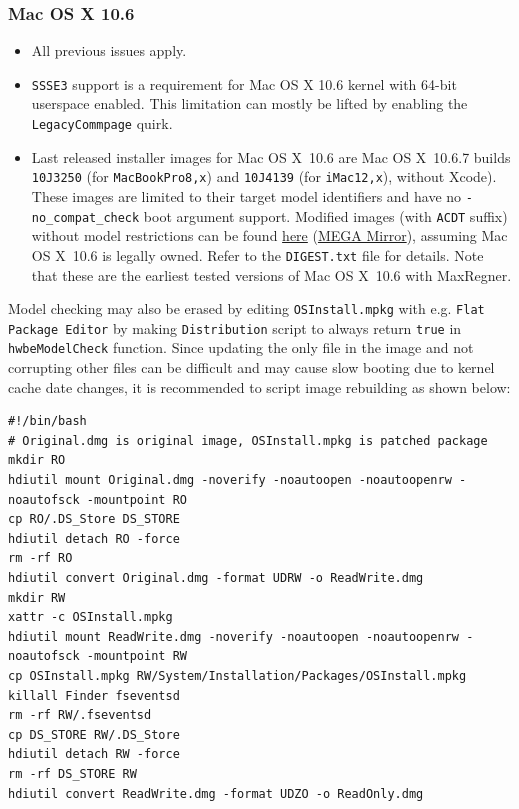 \documentclass[]{article}
\makeatletter
\renewcommand{\label}[1]{%
\zref@wrapper@immediate{\oldlabel{#1}}}  %
\makeatother
\begin{document}
\subsubsection{Mac OS X 10.6}\label{legacy106}

\begin{itemize}
  \item All previous issues apply.
  \item \texttt{SSSE3} support is a requirement for Mac OS X 10.6 kernel
    with 64-bit userspace enabled. This limitation can mostly be lifted
    by enabling the \texttt{LegacyCommpage} quirk.
  \item Last released installer images for Mac OS X~10.6 are Mac OS X~10.6.7
    builds \texttt{10J3250} (for \texttt{MacBookPro8,x}) and
    \texttt{10J4139} (for \texttt{iMac12,x}), without Xcode). These
    images are limited to their target model identifiers and have no
    \texttt{-no\_compat\_check} boot argument support. Modified images
    (with \texttt{ACDT} suffix) without model restrictions can be found
    \href{https://archive.org/details/10.6.7-10j3250-disk-images}{here}
    (\href{https://mega.nz/folder/z5YUhYTb#gA\_IRY5KMuYpnNCg7kR3ug}{MEGA Mirror}),
    assuming Mac OS X~10.6 is legally owned. Refer to the \texttt{DIGEST.txt} file
    for details. Note that these are the earliest tested
    versions of Mac OS X~10.6 with MaxRegner.
\end{itemize}

  Model checking may also be erased by editing \texttt{OSInstall.mpkg}
  with e.g. \texttt{Flat Package Editor} by making \texttt{Distribution}
  script to always return \texttt{true} in \texttt{hwbeModelCheck} function.
  Since updating the only file in the image and not corrupting other files
  can be difficult and may cause slow booting due to kernel cache date
  changes, it is recommended to script image rebuilding as shown below:

\begin{lstlisting}[label=snowrebuild, style=ocbash]
#!/bin/bash
# Original.dmg is original image, OSInstall.mpkg is patched package
mkdir RO
hdiutil mount Original.dmg -noverify -noautoopen -noautoopenrw -noautofsck -mountpoint RO
cp RO/.DS_Store DS_STORE
hdiutil detach RO -force
rm -rf RO
hdiutil convert Original.dmg -format UDRW -o ReadWrite.dmg
mkdir RW
xattr -c OSInstall.mpkg
hdiutil mount ReadWrite.dmg -noverify -noautoopen -noautoopenrw -noautofsck -mountpoint RW
cp OSInstall.mpkg RW/System/Installation/Packages/OSInstall.mpkg
killall Finder fseventsd
rm -rf RW/.fseventsd
cp DS_STORE RW/.DS_Store
hdiutil detach RW -force
rm -rf DS_STORE RW
hdiutil convert ReadWrite.dmg -format UDZO -o ReadOnly.dmg
\end{lstlisting}
\end{document}
